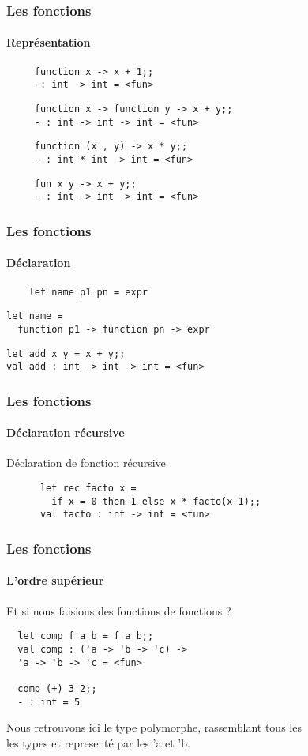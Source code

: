 \begin{frame}[fragile]
	\frametitle{Les fonctions}
	\framesubtitle{Représentation}
	\begin{center}
		\begin{minipage}{10cm}
				\begin{lstlisting}
     function x -> x + 1;;
     -: int -> int = <fun>
				\end{lstlisting}
				\begin{lstlisting}
     function x -> function y -> x + y;;
     - : int -> int -> int = <fun>
				\end{lstlisting}
				\begin{lstlisting}
     function (x , y) -> x * y;;
     - : int * int -> int = <fun>
				\end{lstlisting}
				\begin{lstlisting}
     fun x y -> x + y;;
     - : int -> int -> int = <fun>
				\end{lstlisting}
		\end{minipage}
  \end{center}
\end{frame}

\begin{frame}[fragile]
	\frametitle{Les fonctions}
  	\framesubtitle{Déclaration}
    	\begin{lstlisting}
	let name p1 pn = expr
    	\end{lstlisting}
	\begin{lstlisting}
let name =
  function p1 -> function pn -> expr
  	\end{lstlisting}
  	\vspace{0.4cm}
  	\begin{lstlisting}
let add x y = x + y;;
val add : int -> int -> int = <fun>
  	\end{lstlisting}
\end{frame}

\begin{frame}[fragile]
	\frametitle{Les fonctions}
	\framesubtitle{Déclaration récursive}
	\begin{block}{Déclaration de fonction récursive}
	  \begin{lstlisting}
	  let rec facto x =
	  	if x = 0 then 1 else x * facto(x-1);;
	  val facto : int -> int = <fun>
	  \end{lstlisting}
	\end{block}
\end{frame}

\begin{frame}[fragile]
	\frametitle{Les fonctions}
  	\framesubtitle{L'ordre supérieur}
  	Et si nous faisions des fonctions de fonctions ?
 	\begin{lstlisting}
  let comp f a b = f a b;;
  val comp : ('a -> 'b -> 'c) ->
  'a -> 'b -> 'c = <fun>

  comp (+) 3 2;;
  - : int = 5
 	\end{lstlisting}
	Nous retrouvons ici le type polymorphe, rassemblant tous les\\
	les types et representé par les 'a et 'b.
\end{frame}

